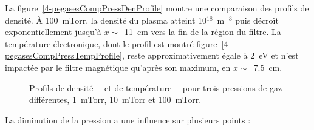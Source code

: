 \begin{refsection}
	La
	figure~\ref{4-pegasesCompPressDenProfile} montre une comparaison des profils
	de densité. À 100~mTorr, la densité du plasma atteint 10$^{18}$~m$^{-3}$ puis
	décroît exponentiellement jusqu'à $x\sim\,$ 11~cm vers la fin de la région
	du filtre. 
	La température électronique, dont le profil est montré
	figure~\ref{4-pegasesCompPressTempProfile}, reste approximativement égale à
	2~eV et n'est impactée par le filtre magnétique qu'après son maximum, en $x\sim\,$ 7.5~cm.
\begin{figure}[!htbp]
  \centering
    \caption{Profils de densité~~ et de
    température~~ pour trois pressions de
    gaz différentes, 1~mTorr, 10~mTorr et 100~mTorr.}
    \label{pegasesCompPressProfils}
\end{figure}
	La diminution de la pression a une influence sur plusieurs points :
	

\end{refsection}
